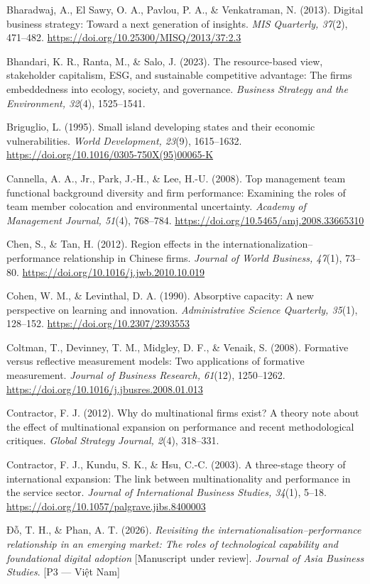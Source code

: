 \documentclass[12pt,a4paper]{article}
\begin{document}
Bharadwaj, A., El Sawy, O. A., Pavlou, P. A., \& Venkatraman, N. (2013).
Digital business strategy: Toward a next generation of insights.
\emph{MIS Quarterly, 37}(2), 471--482.
\url{https://doi.org/10.25300/MISQ/2013/37:2.3}

Bhandari, K. R., Ranta, M., \& Salo, J. (2023). The resource-based view,
stakeholder capitalism, ESG, and sustainable competitive advantage: The
firm\textquotesingle s embeddedness into ecology, society, and
governance. \emph{Business Strategy and the Environment, 32}(4),
1525--1541.

Briguglio, L. (1995). Small island developing states and their economic
vulnerabilities. \emph{World Development, 23}(9), 1615--1632.
\url{https://doi.org/10.1016/0305-750X(95)00065-K}

Cannella, A. A., Jr., Park, J.-H., \& Lee, H.-U. (2008). Top management
team functional background diversity and firm performance: Examining the
roles of team member colocation and environmental uncertainty.
\emph{Academy of Management Journal, 51}(4), 768--784.
\url{https://doi.org/10.5465/amj.2008.33665310}

Chen, S., \& Tan, H. (2012). Region effects in the
internationalization--performance relationship in Chinese firms.
\emph{Journal of World Business, 47}(1), 73--80.
\url{https://doi.org/10.1016/j.jwb.2010.10.019}

Cohen, W. M., \& Levinthal, D. A. (1990). Absorptive capacity: A new
perspective on learning and innovation. \emph{Administrative Science
Quarterly, 35}(1), 128--152. \url{https://doi.org/10.2307/2393553}

Coltman, T., Devinney, T. M., Midgley, D. F., \& Venaik, S. (2008).
Formative versus reflective measurement models: Two applications of
formative measurement. \emph{Journal of Business Research, 61}(12),
1250--1262. \url{https://doi.org/10.1016/j.jbusres.2008.01.013}

Contractor, F. J. (2012). Why do multinational firms exist? A theory
note about the effect of multinational expansion on performance and
recent methodological critiques. \emph{Global Strategy Journal, 2}(4),
318--331.

Contractor, F. J., Kundu, S. K., \& Hsu, C.-C. (2003). A three-stage
theory of international expansion: The link between multinationality and
performance in the service sector. \emph{Journal of International
Business Studies, 34}(1), 5--18.
\url{https://doi.org/10.1057/palgrave.jibs.8400003}

Đỗ, T. H., \& Phan, A. T. (2026). \emph{Revisiting the
internationalisation--performance relationship in an emerging market:
The roles of technological capability and foundational digital adoption}
{[}Manuscript under review{]}. \emph{Journal of Asia Business Studies}.
{[}P3 --- Việt Nam{]}
\end{document}
